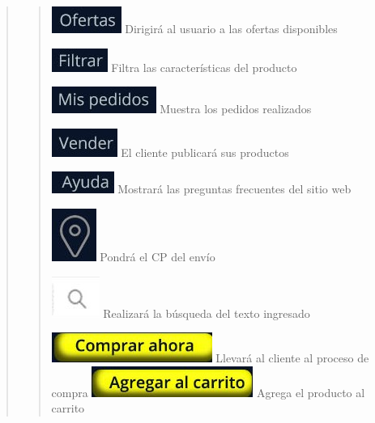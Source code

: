 \documentclass[14pt]{article}
\begin{document}
\begin{quote}
\begin{quote}
                            \includegraphics[height=0.02\textwidth]{BotonOfertas.jpg}
                            \label{P5:BotonOfertas} Dirigirá al usuario a las ofertas disponibles
                            
                            \includegraphics[height=0.02\textwidth]{BotonFiltrar.jpg}
                            \label{P5:BotonFiltrar} Filtra las características del producto
                            
                            \includegraphics[height=0.02\textwidth]{BotonMisPedidos.jpg}
                            \label{P5:BotonMisPedidos} Muestra los pedidos realizados
                           
                            \includegraphics[height=0.02\textwidth]{BotonVender.jpg}
                            \label{P5} El cliente publicará sus productos
                            
                            \includegraphics[height=0.02\textwidth]{BotonAyuda.jpg}
                            \label{P5:BotonAyuda} Mostrará las preguntas frecuentes del sitio web
                            
                            \includegraphics[height=0.02\textwidth]{BotonUbicacion.jpg}
                            \label{P5:BotonUbicacion} Pondrá el CP del envío
                            
                            \includegraphics[height=0.02\textwidth]{BotonBuscar.jpg}
                            \label{P5:BotonBuscar} Realizará la búsqueda del texto ingresado
                            
                            \includegraphics[height=0.02\textwidth]{BotonComprarAhora.jpg}
                            \label{P5:BotonComprarAhora} Llevará al cliente al proceso de compra
                            \includegraphics[height=0.02\textwidth]{BotonAgregarAlCarrito.jpg}
                            \label{P5:BotonAgregarAlCarrito} Agrega el producto al carrito
                            

\end{quote}
\end{quote}
\end{document}
